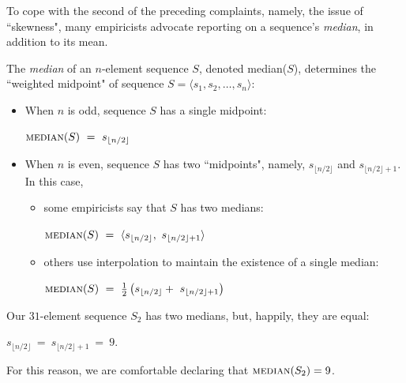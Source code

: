 \bigskip

To cope with the second of the preceding complaints, namely, the issue of ``skewness", many empiricists advocate reporting on a sequence's {\it median}, in addition to its mean.

\smallskip

\noindent
The {\em median} of an $n$-element sequence $S$, denoted {\sc median}($S$), determines 
the ``weighted midpoint" of sequence $S = \langle s_1, s_2, \ldots, s_n \rangle$:

\smallskip

\begin{itemize}
\item
When $n$ is odd, sequence $S$ has a single midpoint:

\smallskip

\hspace*{.35in}
$\mbox{\sc median}(S)  \ = \ s_{\lfloor n/2 \rfloor}$

\medskip\item
When $n$ is even, sequence $S$ has two ``midpoints", namely, $s_{\lfloor n/2 \rfloor}$ and $s_{\lfloor n/2 \rfloor +1}$.  In this case,
  \begin{itemize}
  \item
some empiricists say that $S$ has two medians:

\smallskip

\hspace*{.35in}
$\mbox{\sc median}(S)  \ = \ \langle s_{\lfloor n/2 \rfloor}, \ s_{\lfloor n/2 \rfloor +1} \rangle$

  \medskip\item
others use interpolation to maintain the existence of a single median:

\smallskip

\hspace*{.35in}
$\mbox{\sc median}(S)  \ = \ {1 \over 2} \left(s_{\lfloor n/2 \rfloor} + \ s_{\lfloor n/2 \rfloor +1} \right)$
  \end{itemize}
\end{itemize}
Our $31$-element sequence $S_2$ has two medians, but, happily, they are equal:

\smallskip

\hspace*{.35in}
$s_{\lfloor n/2 \rfloor} \ = \ s_{\lfloor n/2 \rfloor +1} \ = \ 9$.  

\smallskip

\noindent
For this reason, we are comfortable declaring that $\mbox{\sc median}(S_2) = 9$.

